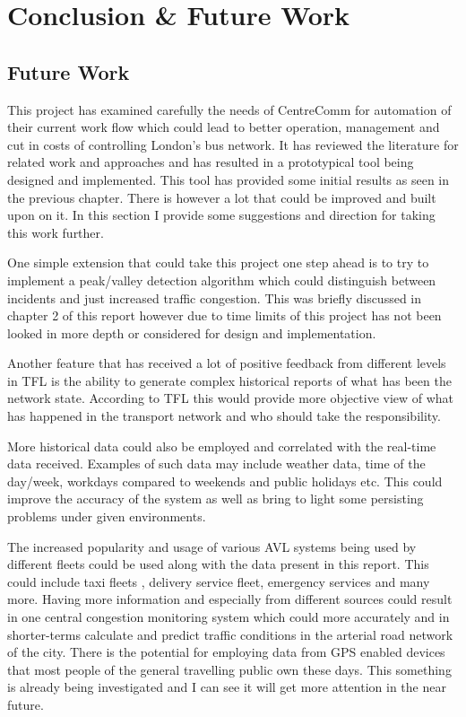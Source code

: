 \chapter{Conclusion \& Future Work}

\section{Future Work}
This project has examined carefully the needs of CentreComm for automation of their current work flow which could lead to better operation, management and cut in costs of controlling London's bus network. It has reviewed the literature for related work and approaches and has resulted in a prototypical tool being designed and implemented. This tool has provided some initial results as seen in the previous chapter. There is however a lot that could be improved and built upon on it. In this section I provide some suggestions and direction for taking this work further.

One simple extension that could take this project one step ahead is to try to implement a peak/valley detection algorithm which could distinguish between incidents and just increased traffic congestion. This was briefly discussed in chapter 2 of this report however due to time limits of this project has not been looked in more depth or considered for design and implementation.

Another feature that has received a lot of positive feedback from different levels in TFL is the ability to generate complex historical reports of what has been the network state. According to TFL this would provide more objective view of what has happened in the transport network and who should take the responsibility. 

More historical data could also be employed and correlated with the real-time data received. Examples of such data may include weather data, time of the day/week, workdays compared to weekends and public holidays etc. This could improve the accuracy of the system as well as bring to light some persisting problems under given environments.

The increased popularity and usage of various AVL systems being used by different fleets could be used along with the data present in this report. This could include taxi fleets \cite{rahmani2010requirements}, delivery service fleet, emergency services and many more. Having more information and especially from different sources could result in one central congestion monitoring system which could more accurately and in shorter-terms calculate and predict traffic conditions in the arterial road network of the city. There is the potential for employing data from GPS enabled devices that most people of the general travelling public own these days. This something is already being investigated \cite{thiagarajan2010cooperative} and I can see it will get more attention in the near future.

